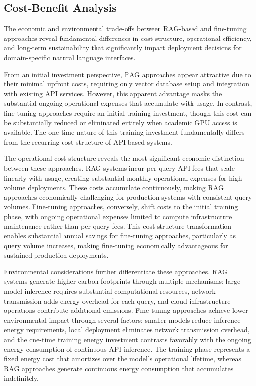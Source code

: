 \subsection{Cost-Benefit Analysis}

The economic and environmental trade-offs between RAG-based and fine-tuning approaches reveal fundamental differences in cost structure, operational efficiency, and long-term sustainability that significantly impact deployment decisions for domain-specific natural language interfaces.

From an initial investment perspective, RAG approaches appear attractive due to their minimal upfront costs, requiring only vector database setup and integration with existing API services. However, this apparent advantage masks the substantial ongoing operational expenses that accumulate with usage. In contrast, fine-tuning approaches require an initial training investment, though this cost can be substantially reduced or eliminated entirely when academic GPU access is available. The one-time nature of this training investment fundamentally differs from the recurring cost structure of API-based systems.

The operational cost structure reveals the most significant economic distinction between these approaches. RAG systems incur per-query API fees that scale linearly with usage, creating substantial monthly operational expenses for high-volume deployments. These costs accumulate continuously, making RAG approaches economically challenging for production systems with consistent query volumes. Fine-tuning approaches, conversely, shift costs to the initial training phase, with ongoing operational expenses limited to compute infrastructure maintenance rather than per-query fees. This cost structure transformation enables substantial annual savings for fine-tuning approaches, particularly as query volume increases, making fine-tuning economically advantageous for sustained production deployments.

Environmental considerations further differentiate these approaches. RAG systems generate higher carbon footprints through multiple mechanisms: large model inference requires substantial computational resources, network transmission adds energy overhead for each query, and cloud infrastructure operations contribute additional emissions. Fine-tuning approaches achieve lower environmental impact through several factors: smaller models reduce inference energy requirements, local deployment eliminates network transmission overhead, and the one-time training energy investment contrasts favorably with the ongoing energy consumption of continuous API inference. The training phase represents a fixed energy cost that amortizes over the model's operational lifetime, whereas RAG approaches generate continuous energy consumption that accumulates indefinitely.


